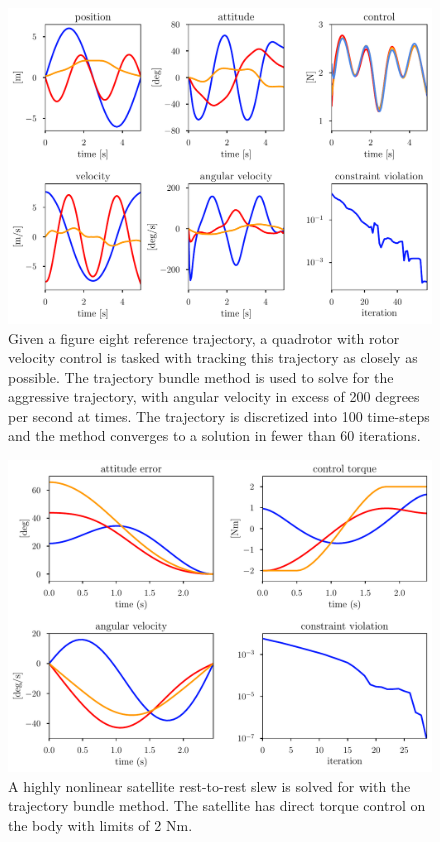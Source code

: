 \begin{figure}
    \centering
    \includegraphics[width=0.9\linewidth]{bundles/examples/drone_fig.pdf}
    \caption{Given a figure eight reference trajectory, a quadrotor with rotor velocity control is tasked with tracking this trajectory as closely as possible. The trajectory bundle method is used to solve for the aggressive trajectory, with angular velocity in excess of 200 degrees per second at times. The trajectory is discretized into 100 time-steps and the method converges to a solution in fewer than 60 iterations.}
    \label{fig:btb:drone}
\end{figure}


\begin{figure}
    \centering
    \includegraphics[width=0.9\linewidth]{bundles/examples/satellite_fig_2.pdf}
    \caption{A highly nonlinear satellite rest-to-rest slew is solved for with the trajectory bundle method. The satellite has direct torque control on the body with limits of 2 Nm.}
    \label{fig:btb:satellite}
\end{figure}

